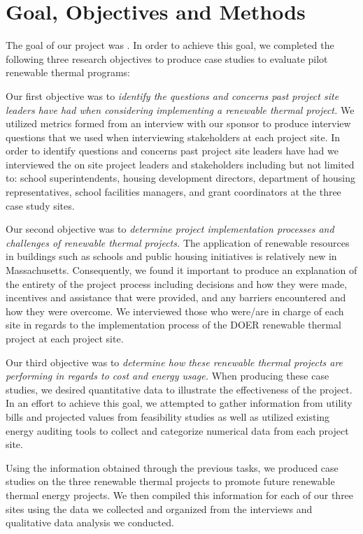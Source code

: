 \section*{Goal, Objectives and Methods}
\par The goal of our project was \goal. In order to achieve this goal, we completed the following three research objectives to produce case studies to evaluate pilot renewable thermal programs:
\par Our first objective was to \emph{identify the questions and concerns past project site leaders have had when considering implementing a renewable thermal project.} We utilized metrics formed from an interview with our sponsor to produce interview questions that we used when interviewing stakeholders at each project site. In order to identify questions and concerns past project site leaders have had we interviewed the on site project leaders and stakeholders including but not limited to: school superintendents, housing development directors, department of housing representatives, school facilities managers, and grant coordinators at the three case study sites. 
\par Our second objective was to \emph{determine project implementation processes and challenges of renewable thermal projects.} The application of renewable resources in buildings such as schools and public housing initiatives is relatively new in Massachusetts. Consequently, we found it important to produce an explanation of the entirety of the project process including decisions and how they were made, incentives and assistance that were provided, and any barriers encountered and how they were overcome. We interviewed those who were/are in charge of each site in regards to the implementation process of the DOER renewable thermal project at each project site.
\par Our third objective was to \emph{determine how these renewable thermal projects are performing in regards to cost and energy usage.} When producing these case studies, we desired quantitative data to illustrate the effectiveness of the project. In an effort to achieve this goal, we attempted to gather information from utility bills and projected values from feasibility studies as well as utilized existing energy auditing tools to collect and categorize numerical data from each project site.
\par Using the information obtained through the previous tasks, we produced case studies on the three renewable thermal projects to promote future renewable thermal energy projects. We then compiled this information for each of our three sites using the data we collected and organized from the interviews and qualitative data analysis we conducted.

